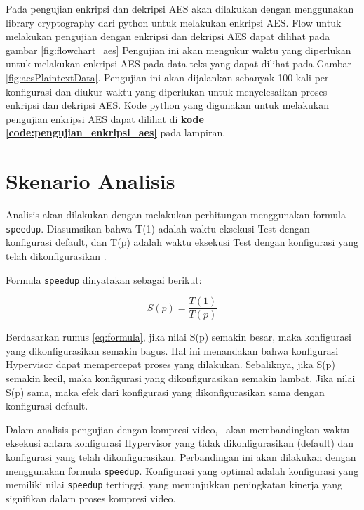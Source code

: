 Pada pengujian enkripsi dan dekripsi AES akan dilakukan dengan menggunakan library cryptography dari python untuk melakukan enkripsi AES. Flow untuk melakukan pengujian dengan enkripsi dan dekripsi AES dapat dilihat pada gambar \ref{fig:flowchart_aes} Pengujian ini akan mengukur waktu yang diperlukan untuk melakukan enkripsi AES pada data teks yang dapat dilihat pada Gambar \ref{fig:aesPlaintextData}. Pengujian ini akan dijalankan sebanyak 100 kali per konfigurasi dan diukur waktu yang diperlukan untuk menyelesaikan proses enkripsi dan dekripsi AES. Kode python yang digunakan untuk melakukan pengujian enkripsi AES dapat dilihat di \textbf{kode \ref{code:pengujian_enkripsi_aes}} pada lampiran.

\section{Skenario Analisis}
Analisis akan dilakukan dengan melakukan perhitungan menggunakan formula \texttt{speedup}. Diasumsikan bahwa T(1) adalah waktu eksekusi Test dengan konfigurasi default, dan T(p) adalah waktu eksekusi Test dengan konfigurasi yang telah dikonfigurasikan \cite{beuwolfCetin}.

Formula \texttt{speedup} dinyatakan sebagai berikut:

\begin{equation}
    S(p) = \frac{T(1)}{T(p)}
    \label{eq:formula}
\end{equation}

Berdasarkan rumus \ref{eq:formula}, jika nilai S(p) semakin besar, maka konfigurasi yang dikonfigurasikan semakin bagus. Hal ini menandakan bahwa konfigurasi Hypervisor dapat mempercepat proses yang dilakukan. Sebaliknya, jika S(p) semakin kecil, maka konfigurasi yang dikonfigurasikan semakin lambat. Jika nilai S(p) sama, maka efek dari konfigurasi yang dikonfigurasikan sama dengan konfigurasi default.

Dalam analisis pengujian dengan kompresi video, \saya\ akan membandingkan waktu eksekusi antara konfigurasi Hypervisor yang tidak dikonfigurasikan (default) dan konfigurasi yang telah dikonfigurasikan. Perbandingan ini akan dilakukan dengan menggunakan formula \texttt{speedup}. Konfigurasi yang optimal adalah konfigurasi yang memiliki nilai \texttt{speedup} tertinggi, yang menunjukkan peningkatan kinerja yang signifikan dalam proses kompresi video.

